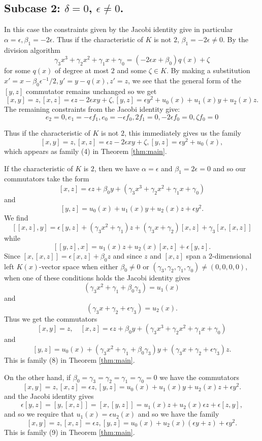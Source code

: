 \documentclass[a4paper,11pt,twoside,notitlepage,reqno]{amsart}
\theoremstyle{plain}
\numberwithin{thm}{section}
\theoremstyle{definition}
\begin{document}
\subsection{Subcase 2: $\delta=0$, $\epsilon \neq 0$.}
In this case the constraints given by the Jacobi identity give in particular $\alpha=\epsilon, \beta_1=-2\epsilon$.  Thus if the characteristic of $K$ is not $2$, $\beta_1=-2\epsilon \neq 0$.
By the division algorithm $$\gamma_3 x^3+ \gamma_2 x^2 + \gamma_1 x + \gamma_0= (-2\epsilon x+\beta_0) q(x) + \zeta$$ for some $q(x)$ of degree at most $2$ and some $\zeta\in K$.  By making a substitution $x'=x-\beta_0\epsilon^{-1}/2, y'=y-q(x), z'=z$, we see that the general form of the $[y,z]$ commutator remains unchanged so we get
$$[x,y]=z, [x,z]=\epsilon z -2\epsilon xy +\zeta, [y,z]=\epsilon y^2 +u_0(x)+u_1(x)y+u_2(x)z.$$
The remaining constraints from the Jacobi identity give:
$$ e_2=0, e_1=-\epsilon f_1, e_0=-\epsilon f_0, 2 f_1=0, -2\epsilon f_0=0, \zeta f_0 =0$$

Thus if the characteristic of $K$ is not $2$, this immediately gives us the family
$$[x,y]=z, [x,z]=\epsilon z -2\epsilon xy +\zeta, [y,z]=\epsilon y^2 +u_0(x),$$ which appears as family (4) in Theorem \ref{thm:main}.

If the characteristic of $K$ is $2$, then we have $\alpha=\epsilon$ and $\beta_1=2\epsilon=0$ and so our commutators take the form
$$[x,z]= \epsilon z +\beta_0 y + (\gamma_3 x^3+ \gamma_2 x^2 + \gamma_1 x + \gamma_0 )$$
and
$$[y,z]= u_0(x) + u_1(x) y + u_2(x) z + \epsilon y^2.$$
We find $$[[x,z],y]=\epsilon [y,z] + (\gamma_3 x^2+\gamma_1)z + (\gamma_3 x+\gamma_2)[x,z]+\gamma_3[x,[x,z]]$$
while $$[[y,z],x]= u_1(x) z + u_2(x) [x,z]+ \epsilon [y,z].$$
Since $[x,[x,z]]= \epsilon [x,z] + \beta_0 z$ and since $z$ and $[x,z]$ span a $2$-dimensional left $K(x)$-vector space when either $\beta_0\neq 0$ or $(\gamma_3,\gamma_2,\gamma_1,\gamma_0)\neq (0,0,0,0)$, when one of these conditions holds the Jacobi identity gives
$$ (\gamma_3 x^2+\gamma_1+\beta_0\gamma_3)=u_1(x)$$ and
$$(\gamma_3 x+\gamma_2+\epsilon\gamma_3) = u_2(x).$$
Thus we get the commutators 
$$[x,y]=z,\quad [x,z]=  \epsilon z +\beta_0 y + (\gamma_3 x^3+ \gamma_2 x^2 + \gamma_1 x + \gamma_0 )$$
and $$[y,z] = u_0(x)+(\gamma_3 x^2+\gamma_1+\beta_0\gamma_3)y+(\gamma_3 x+\gamma_2+\epsilon\gamma_3)z.$$
This is family (8) in Theorem \ref{thm:main}.

On the other hand, if $\beta_0=\gamma_3=\gamma_2=\gamma_1=\gamma_0=0$ we have the commutators
$$[x,y]=z, [x,z] =\epsilon z, [y,z] = u_0(x) + u_1(x) y + u_2(x) z + \epsilon y^2.$$
and the Jacobi identity gives
$$\epsilon [y,z] = [y,[x,z]] = [x,[y,z]] = u_1(x) z + u_2(x) \epsilon z + \epsilon [z,y],$$ and so we require that $u_1(x)=\epsilon u_2(x)$ and so we have the family
$$[x,y]=z, [x,z]=\epsilon z, [y,z]= u_0(x)+u_2(x)(\epsilon y+z)+\epsilon y^2.$$
This is family (9) in Theorem \ref{thm:main}.
 
\end{document}
